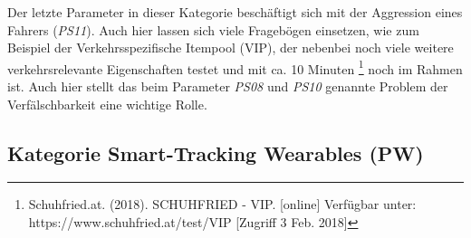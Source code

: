 Der letzte Parameter in dieser Kategorie beschäftigt sich mit der Aggression eines Fahrers (\textit{PS11}). Auch hier lassen sich viele Fragebögen einsetzen, wie zum Beispiel der Verkehrsspezifische Itempool (VIP), der nebenbei noch viele weitere verkehrsrelevante Eigenschaften testet und mit ca. 10 Minuten \footnote{Schuhfried.at. (2018). SCHUHFRIED - VIP. [online] Verfügbar unter: https://www.schuhfried.at/test/VIP [Zugriff 3 Feb. 2018]} noch im Rahmen ist. Auch hier stellt das beim Parameter \textit{PS08} und \textit{PS10} genannte Problem der Verfälschbarkeit eine wichtige Rolle.


\subsection{Kategorie Smart-Tracking Wearables (PW)}
